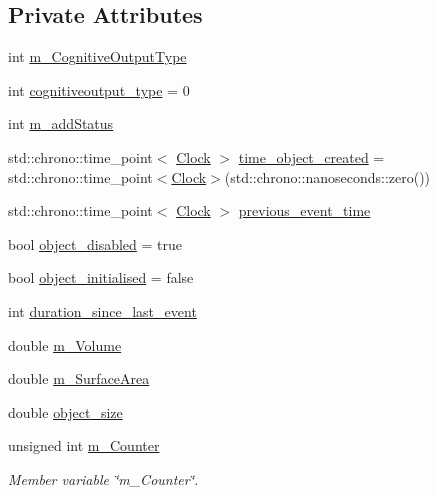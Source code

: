 \subsection*{Private Attributes}
\begin{DoxyCompactItemize}
\item 
int \mbox{\hyperlink{classCognitiveOutput_a6b32711e6c93d36549d74e4b6d62661a}{m\+\_\+\+Cognitive\+Output\+Type}}
\item 
int \mbox{\hyperlink{classCognitiveOutput_aa34f8a3f6ab3e87ed1f5f3d749b259ac}{cognitiveoutput\+\_\+type}} = 0
\item 
int \mbox{\hyperlink{classCognitiveOutput_a3c40436281f3f5b737c23eaf27992b7e}{m\+\_\+add\+Status}}
\item 
std\+::chrono\+::time\+\_\+point$<$ \mbox{\hyperlink{universe_8h_a0ef8d951d1ca5ab3cfaf7ab4c7a6fd80}{Clock}} $>$ \mbox{\hyperlink{classCognitiveOutput_abc217a60acde159374e7a963d41e7958}{time\+\_\+object\+\_\+created}} = std\+::chrono\+::time\+\_\+point$<$\mbox{\hyperlink{universe_8h_a0ef8d951d1ca5ab3cfaf7ab4c7a6fd80}{Clock}}$>$(std\+::chrono\+::nanoseconds\+::zero())
\item 
std\+::chrono\+::time\+\_\+point$<$ \mbox{\hyperlink{universe_8h_a0ef8d951d1ca5ab3cfaf7ab4c7a6fd80}{Clock}} $>$ \mbox{\hyperlink{classCognitiveOutput_a68908403a0b612166f4a792b9203bf5e}{previous\+\_\+event\+\_\+time}}
\item 
bool \mbox{\hyperlink{classCognitiveOutput_a98ea154677177728cee120f3df672b35}{object\+\_\+disabled}} = true
\item 
bool \mbox{\hyperlink{classCognitiveOutput_aa473757ad75f1323f88730dc8a4aecc2}{object\+\_\+initialised}} = false
\item 
int \mbox{\hyperlink{classCognitiveOutput_acb201c341494433a1d33046f416cb5e9}{duration\+\_\+since\+\_\+last\+\_\+event}}
\item 
double \mbox{\hyperlink{classCognitiveOutput_a1e922926257d3711b41a2678ffe688a9}{m\+\_\+\+Volume}}
\item 
double \mbox{\hyperlink{classCognitiveOutput_a2e5b68f69ee1e76d825cd3e94443cb67}{m\+\_\+\+Surface\+Area}}
\item 
double \mbox{\hyperlink{classCognitiveOutput_ac1bfcefdc6ddd280d3728dd7804dbf1f}{object\+\_\+size}}
\item 
unsigned int \mbox{\hyperlink{classCognitiveOutput_aa13ff7dd07fd25127447cbc5699e41a3}{m\+\_\+\+Counter}}
\begin{DoxyCompactList}\small\item\em Member variable \char`\"{}m\+\_\+\+Counter\char`\"{}. \end{DoxyCompactList}\item 

\end{DoxyCompactItemize}
